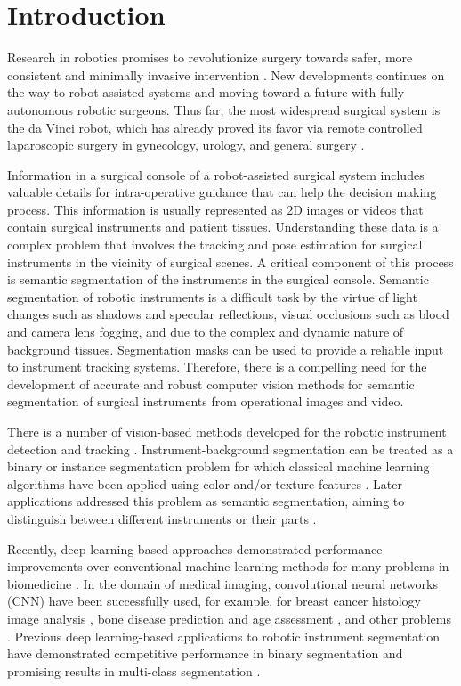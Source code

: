 \documentclass[runningheads,a4paper]{llncs}[2015/06/24]
\begin{document}
\section{Introduction}\label{sec:intro}

Research in robotics promises to revolutionize surgery towards safer, more consistent and minimally invasive intervention \cite{burgner2015continuum, munzer2018content}. New developments continues on the way to robot-assisted systems and moving toward a future with fully autonomous robotic surgeons. Thus far, the most widespread surgical system is the da Vinci robot, which has already proved its favor via remote controlled laparoscopic surgery in gynecology, urology, and general surgery \cite{burgner2015continuum}.


Information in a surgical console of a robot-assisted surgical system includes valuable details for intra-operative guidance that can help the decision making process. This information is usually represented as 2D images or videos that contain surgical instruments and patient tissues. Understanding these data is a complex problem that involves the tracking and pose estimation for surgical instruments in the vicinity of surgical scenes. A critical component of this process is semantic segmentation of the instruments in the surgical console. Semantic segmentation of robotic instruments is a difficult task by the virtue of light changes such as shadows and specular reflections, visual occlusions such as blood and camera lens fogging, and due to the complex and dynamic nature of background tissues. Segmentation masks can be used to provide a reliable input to instrument tracking systems. Therefore, there is a compelling need for the development of accurate and robust computer vision methods for semantic segmentation of surgical instruments from operational images and video. 

There is a number of vision-based methods developed for the robotic instrument detection and tracking \cite{munzer2018content}. Instrument-background segmentation can be treated as a binary or instance segmentation problem for which classical machine learning algorithms have been applied using color and/or texture features  \cite{speidel2006tracking, doignon2007segmentation}. Later applications addressed this problem as semantic segmentation, aiming to distinguish between different instruments or their parts \cite{pezzementi2009articulated, bouget2015detecting}.

Recently, deep learning-based approaches demonstrated performance improvements over conventional machine learning methods for many problems in biomedicine \cite{ching2017opportunities, kalinin2018deep}. In the domain of medical imaging, convolutional neural networks (CNN) have been successfully used, for example, for breast cancer histology image analysis \cite{rakhlin2018deep}, bone disease prediction \cite{tiulpin2018automatic} and age assessment \cite{iglovikov2017pediatric}, and other problems \cite{ching2017opportunities}. Previous deep learning-based applications to robotic instrument segmentation have demonstrated competitive performance in binary segmentation \cite{garcia2017toolnet, attia2017surgical} and promising results in multi-class segmentation \cite{pakhomov2017deep}.
\end{document}
